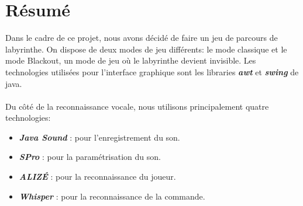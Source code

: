 \section{Résumé}
\label{sec:resume}

Dans le cadre de ce projet, nous avons décidé de faire un jeu de parcours de labyrinthe. On dispose de deux modes de jeu différents: le mode classique et le mode Blackout,
un mode de jeu où le labyrinthe devient invisible. Les technologies utilisées pour l'interface graphique sont les libraries \textbf{\textit{awt}} et \textbf{\textit{swing}} de java. \\\\
Du côté de la reconnaissance vocale, nous utilisons principalement quatre technologies:
\begin{itemize}
    \item \textbf{\textit{Java Sound}} : pour l'enregistrement du son.
    \item \textbf{\textit{SPro}} : pour la paramétrisation du son.
    \item \textbf{\textit{ALIZÉ}} : pour la reconnaissance du joueur.
    \item \textbf{\textit{Whisper}} : pour la reconnaissance de la commande.
\end{itemize}

